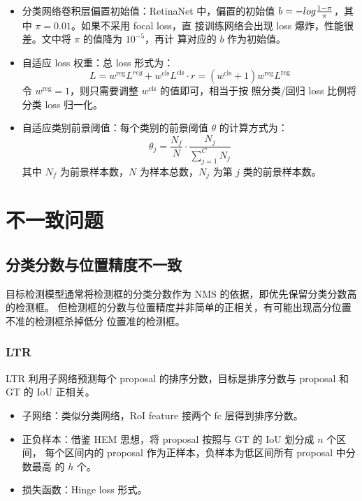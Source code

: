 \begin{itemize}
  \item 分类网络卷积层偏置初始值：RetinaNet 中，偏置的初始值 $b =
    -\\log\frac{1-\pi}{\pi}$，其中 $\pi=0.01$。如果不采用 focal loss，直
    接训练网络会出现 loss 爆炸，性能很差。文中将 $\pi$ 的值降为 $10^{-5}$，再计
    算对应的 $b$ 作为初始值。
  \item 自适应 loss 权重：总 loss 形式为：
    \begin{equation}
    L = w^{\mathrm{reg}} L^{reg} +
    w^{\mathrm{cls}} L^{\mathrm{cls}} \cdot r = \left( w^{\mathrm{cls}} + 1
    \right) w^{\mathrm{reg}} L^{\mathrm{reg}}
    \end{equation}
    令 $w^{\mathrm{reg}} = 1$，则只需要调整 $w^{\mathrm{cls}}$ 的值即可，相当于按
    照分类/回归 loss 比例将分类 loss 归一化。
  \item 自适应类别前景阈值：每个类别的前景阈值 $\theta$ 的计算方式为：
    \begin{equation}
      \theta_j = \frac{N_f}{N} \cdot \frac{N_j}{\sum_{j=1}^{C} N_j}
    \end{equation}
    其中 $N_f$ 为前景样本数，$N$ 为样本总数，$N_j$ 为第 $j$ 类的前景样本数。
\end{itemize}

\section{不一致问题}
\subsection{分类分数与位置精度不一致}
目标检测模型通常将检测框的分类分数作为 NMS 的依据，即优先保留分类分数高的检测框。
但检测框的分数与位置精度并非简单的正相关，有可能出现高分位置不准的检测框杀掉低分
位置准的检测框。

\subsubsection{LTR}
LTR 利用子网络预测每个 proposal 的排序分数，目标是排序分数与 proposal 和 GT 的
IoU 正相关。

\begin{itemize}
  \item 子网络：类似分类网络，RoI feature 接两个 fc 层得到排序分数。
  \item 正负样本：借鉴 HEM 思想，将 proposal 按照与 GT 的 IoU 划分成 $n$ 个区间，
    每个区间内的 proposal 作为正样本，负样本为低区间所有 proposal 中分数最高
    的 $h$ 个。
  \item 损失函数：Hinge loss 形式。
\end{itemize}

